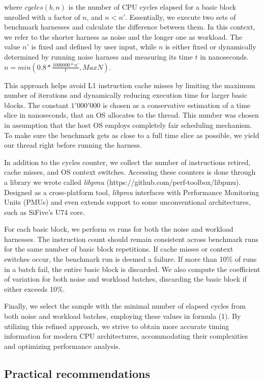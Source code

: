 where $cycles(b, n)$ is the number of CPU cycles elapsed for a basic block unrolled with a factor of $n$, and $n < n'$. Essentially, we execute two sets of benchmark harnesses and calculate the difference between them. In this context, we refer to the shorter harness as noise and the longer one as workload. The value $n'$ is fixed and defined by user input, while $n$ is either fixed or dynamically determined by running noise harness and measuring its time $t$ in nanoseconds.
$n = min(0.8*\frac{1000000 * n'}{t}, MaxN)$.

This approach helps avoid L1 instruction cache misses by limiting the maximum number of iterations and dynamically reducing execution time for larger basic blocks. The constant $1'000'000$ is chosen as a conservative estimation of a time slice in nanoseconds, that an OS allocates to the thread. This number was chosen in assumption that the host OS employs completely fair scheduling mechanism. To make sure the benchmark gets as close to a full time slice as possible, we yield our thread right before running the harness.

In addition to the cycles counter, we collect the number of instructions retired, cache misses, and OS context switches. Accessing these counters is done through a library we wrote called \textit{libpmu} (https://github.com/perf-toolbox/libpmu). Designed as a cross-platform tool, \textit{libpmu} interfaces with Performance Monitoring Units (PMUs) and even extends support to some unconventional architectures, such as SiFive's U74 core.

For each basic block, we perform $m$ runs for both the noise and workload harnesses. The instruction count should remain consistent across benchmark runs for the same number of basic block repetitions. If cache misses or context switches occur, the benchmark run is deemed a failure. If more than 10\% of runs in a batch fail, the entire basic block is discarded. We also compute the coefficient of variation for both noise and workload batches, discarding the basic block if either exceeds 10\%.

Finally, we select the sample with the minimal number of elapsed cycles from both noise and workload batches, employing these values in formula (1). By utilizing this refined approach, we strive to obtain more accurate timing information for modern CPU architectures, accommodating their complexities and optimizing performance analysis.

\subsection{Practical recommendations}

